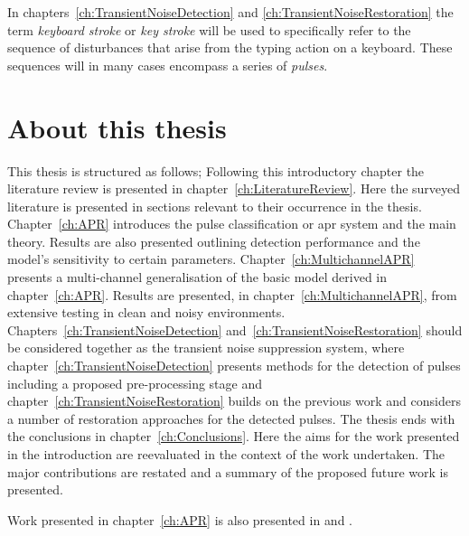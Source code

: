 In chapters~\ref{ch:TransientNoiseDetection} and \ref{ch:TransientNoiseRestoration} the term \emph{keyboard stroke} or \emph{key stroke} will be used to specifically refer to the sequence of disturbances that arise from the typing action on a keyboard. These sequences will in many cases encompass a series of \emph{pulses}.


\section{About this thesis}
This thesis is structured as follows; Following this introductory chapter the literature review is presented in chapter~\ref{ch:LiteratureReview}. Here the surveyed literature is presented in sections relevant to their occurrence in the thesis. Chapter~\ref{ch:APR} introduces the pulse classification or \gls{apr} system and the main theory. Results are also presented outlining detection performance and the model's sensitivity to certain parameters. Chapter~\ref{ch:MultichannelAPR} presents a multi-channel generalisation of the basic model derived in chapter~\ref{ch:APR}. Results are presented, in chapter~\ref{ch:MultichannelAPR}, from extensive testing in clean and noisy environments. Chapters~\ref{ch:TransientNoiseDetection} and~\ref{ch:TransientNoiseRestoration} should be considered together as the transient noise suppression system, where chapter~\ref{ch:TransientNoiseDetection} presents methods for the detection of pulses including a proposed pre-processing stage and chapter~\ref{ch:TransientNoiseRestoration} builds on the previous work and considers a number of restoration approaches for the detected pulses. The thesis ends with the conclusions in chapter~\ref{ch:Conclusions}. Here the aims for the work presented in the introduction are reevaluated in the context of the work undertaken. The major contributions are restated and a summary of the proposed future work is presented.

Work presented in chapter~\ref{ch:APR} is also presented in \cite{Christensen2011} and \cite{US20110316784}.


